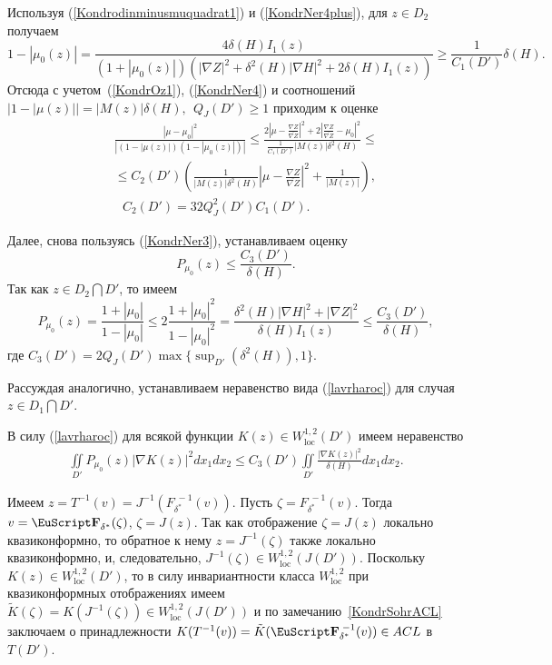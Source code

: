 Используя (\ref{Kondrodinminusmuquadrat1}) и (\ref{KondrNer4plus}), для $z\in D_2$ получаем
$$
1-|{\mu_0}(z)|=\frac{4\delta(H) I_1(z)}{
(1+|{\mu_0}(z)|)\left( |\nabla
Z|^2+\delta^2(H)|\nabla H|^2+2\delta(H) I_1(z)
\right) } \geq\frac{1}{C_1(D')}\delta(H).$$
Отсюда с учетом~(\ref{KondrOz1}), (\ref{KondrNer4}) и соотношений
$|1-|\mu(z)||=|M(z)|\delta(H),
\ \ Q_J(D')\geq1$ приходим к оценке
\begin{eqnarray}
&&\frac{|\mu-{\mu_0}|^2}{|(1-|\mu(z)|)(1-|{\mu_0}(z)|)|}\leq
\frac{2\left| \mu-\frac{\nabla
Z}{\overline{\nabla
Z}}\right|^2+2\left|\frac{\nabla
Z}{\overline{\nabla Z}}-{\mu_0}
\right|^2}{\frac{1}{C_1(D')}|M(z)|\delta^2(H)}\leq
\nonumber\\
&&\leq C_2(D')\left(
\frac{1}{|M(z)|\delta^2(H)}\left|
\mu-\frac{\nabla Z}{ \overline{\nabla Z}}
\right|^2+\frac{1}{|M(z)|} \right),  \label{Kondroc1}\\
&&\ \ \ C_2(D')=32Q_J^2(D')C_1(D').\nonumber
\end{eqnarray}


 Далее, снова пользуясь (\ref{KondrNer3}), устанавливаем  оценку
\begin{equation}\label{lavrharoc}
P_{\mu_0}(z)\leq
\frac{C_3(D')}{\delta(H)}.
\end{equation}
Так как $z\in D_2\bigcap D'$, то имеем
$$
P_{\mu_0}(z)=\frac{1+|\mu_0|}{1-|{\mu_0}|}\leq2
\frac{1+|{\mu_0}|^2}{1-|{\mu_0}|^2}=
\frac{\delta^2(H)|\nabla H|^2+|\nabla
Z|^2}{\delta(H) I_1(z)}\leq
\frac{C_3(D')}{\delta(H)},
$$
где
$C_3(D')=2Q_J(D')\max\{\sup_{D'}(\delta^2(H)),1\}.$

Рассуждая аналогично,
устанавливаем неравенство вида (\ref{lavrharoc}) для случая $z\in D_1\bigcap D'$.

В силу (\ref{lavrharoc}) для всякой функции $K(z)\in W^{1,2}_{\mathrm{loc}}(D')$ имеем неравенство
\begin{eqnarray}
\iint\limits_{D'}P_{\mu_0}(z)
|\nabla K(z)|^2dx_1dx_2\leq C_3(D')\iint\limits_{D'}\frac{ |\nabla
K(z)|^2}{\delta(H)}dx_1dx_2.
\label{Kondroc2}
\end{eqnarray}


Имеем $z=T^{-1}(v)=J^{-1}(F^{\;-1}_{\delta^{*}}(v))$.
Пусть $\zeta =F^{\;-1}_{\delta^{*}}(v).$
Тогда $v=\FF_{\delta^{*}}(\zeta )$, $\zeta =J(z)$. Так как отображение
$\zeta =J(z)$ локально квазиконформно, то обратное к нему
$z=J^{-1}(\zeta )$ также локально квазиконформно, и, следовательно,
$J^{-1}(\zeta )\in W^{1,2}_{\mathrm{loc}}(J(D')).$
Поскольку  $K(z)\in
W^{1,2}_{\mathrm{loc}}(D')$, то в силу
инвариантности класса $W^{1,2}_{\mathrm{loc}}$
при квазиконформных отображениях имеем
$\tilde{K}(\zeta )=K(J^{-1}(\zeta ))\in
W^{1,2}_{\mathrm{loc}}(J(D'))$ и по замечанию~\ref{KondrSohrACL} заключаем о принадлежности
$K(T^{-1}(v))=\tilde{K}(\FF_{\delta^{*}}^{\;-1}(v))\in ACL$ в $T(D')$.

